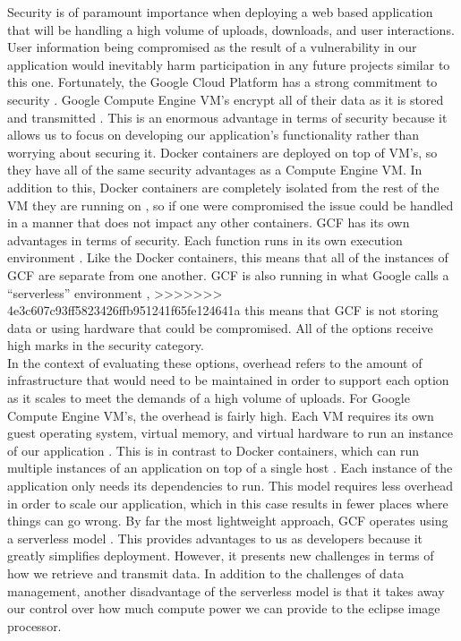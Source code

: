 \documentclass[10pt, onecolumn, draftclsnofoot, letterpaper, compsoc]{IEEEtran}
\begin{document}
Security is of paramount importance when deploying a web based application that
will be handling a high volume of uploads, downloads, and user interactions.
User information being compromised as the result of a vulnerability in our
application would inevitably harm participation in any future projects similar
to this one. Fortunately, the Google Cloud Platform has a strong commitment to
security \cite{gcp}. Google Compute Engine VM's encrypt all of their data as it
is stored and transmitted \cite{gcp}. This is an enormous advantage in terms of
security because it allows us to focus on developing our application's
functionality rather than worrying about securing it. Docker containers are
deployed on top of VM's, so they have all of the same security advantages as a
Compute Engine VM. In addition to this, Docker containers are completely
isolated from the rest of the VM they are running on \cite{docker}, so if one
were compromised the issue could be handled in a manner that does not impact any
other containers. GCF has its own advantages in terms of security. Each function
runs in its own execution environment \cite{docker}. Like the Docker containers,
this means that all of the instances of GCF are separate from one another. GCF
is also running in what Google calls a ``serverless” environment \cite{docker},
>>>>>>> 4e3c607c93ff5823426ffb951241f65fe124641a
this means that GCF is not storing data or using hardware that could be
compromised. All of the options receive high marks in the security category. \\

In the context of evaluating these options, overhead refers to the amount of
infrastructure that would need to be maintained in order to support each option
as it scales to meet the demands of a high volume of uploads. For Google Compute
Engine VM’s, the overhead is fairly high. Each VM requires its own guest
operating system, virtual memory, and virtual hardware to run an instance of our
application \cite{docker, gcf}. This is in contrast to Docker containers, which
can run multiple instances of an application on top of a single host
\cite{docker}. Each instance of the application only needs its dependencies to
run. This model requires less overhead in order to scale our application, which
in this case results in fewer places where things can go wrong. By far the most
lightweight approach, GCF operates using a serverless model \cite{gcp}. This
provides advantages to us as developers because it greatly simplifies
deployment. However, it presents new challenges in terms of how we retrieve and
transmit data. In addition to the challenges of data management, another
disadvantage of the serverless model is that it takes away our control over how
much compute power we can provide to the eclipse image processor. \\
\end{document}
